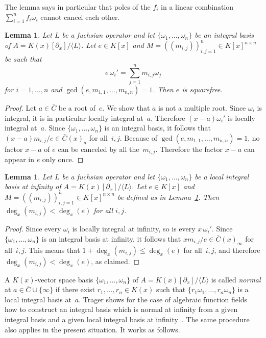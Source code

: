 \documentclass[final,1p,times,authoryear]{elsarticle}
\newtheorem{lemma}[theorem]{Lemma}
\def\<#1>{\langle#1\rangle}
\begin{document}
The lemma says in particular that poles of the $f_i$ in a linear combination
$\sum_{i=1}^n f_i\omega_i$ cannot cancel each other.

\begin{lemma}\label{lemma:e}
  Let $L$ be a fuchsian operator and let
  $\{\omega_1,\dots,\omega_n\}$ be an integral basis of $A=K(x)[\partial_x]/\<L>$.
  Let $e\in K[x]$ and
  $M=((m_{i,j}))_{i,j=1}^n\in K[x]^{n\times n}$ be such that
  \[
    e\,\omega_i'=\sum_{j=1}^n m_{i,j}\omega_j
  \]
  for $i=1,\dots,n$ and $\gcd(e,m_{1,1},\dots,m_{n,n})=1$.
  Then $e$ is squarefree.
\end{lemma}
\begin{proof}
  Let $a\in\bar C$ be a root of~$e$. We show that $a$ is not a multiple root.
  Since $\omega_i$ is integral, it is in particular locally integral at~$a$.
  Therefore $(x-a)\omega_i'$ is locally integral at~$a$.
  Since $\{\omega_1,\dots,\omega_n\}$ is an integral basis, it follows that
  $(x-a)m_{i,j}/e\in\bar C(x)_a$ for all~$i,j$.
  Because of $\gcd(e,m_{1,1},\dots,m_{n,n})=1$, no factor $x-a$ of $e$
  can be canceled by all the~$m_{i,j}$.
  Therefore the factor $x-a$ can appear in $e$ only once.
\end{proof}

\begin{lemma} \label{lemma:degM}
  Let $L$ be a fuchsian operator and let $\{\omega_1,\dots,\omega_n\}$ be a local integral
  basis at infinity of $A=K(x)[\partial_x]/\<L>$. Let $e\in K[x]$ and $M=((m_{i,j}))_{i,j=1}^n\in K[x]^{n\times n}$
  be defined as in Lemma~\ref{lemma:e}. Then $\deg_x(m_{i,j})<\deg_x(e)$ for all $i,j$.
\end{lemma}
\begin{proof}
  Since every $\omega_i$ is locally integral at infinity, so is every $x\,\omega_i'$.
  Since $\{\omega_1,\dots,\omega_n\}$ is an integral basis at infinity, it follows that
  $xm_{i,j}/e\in\bar C(x)_\infty$ for all~$i,j$. This means that $1+\deg_x(m_{i,j})\leq\deg_x(e)$
  for all~$i,j$, and therefore $\deg_x(m_{i,j})<\deg_x(e)$, as claimed.
\end{proof}

A $K(x)$-vector space basis $\{\omega_1,\dots,\omega_n\}$ of $A=K(x)[\partial_x]/\<L>$ is
called \emph{normal} at $a\in\bar C\cup\{\infty\}$ if there exist $r_1,\dots,r_n\in
K(x)$ such that $\{r_1\omega_1,\dots,r_n\omega_n\}$ is a local integral basis
at~$a$. Trager shows for the case of algebraic function fields how to construct
an integral basis which is normal at infinity from a given integral basis and
a given local integral basis at infinity~\citep{trager84}. The same procedure also applies
in the present situation. It works as follows.
\end{document}
